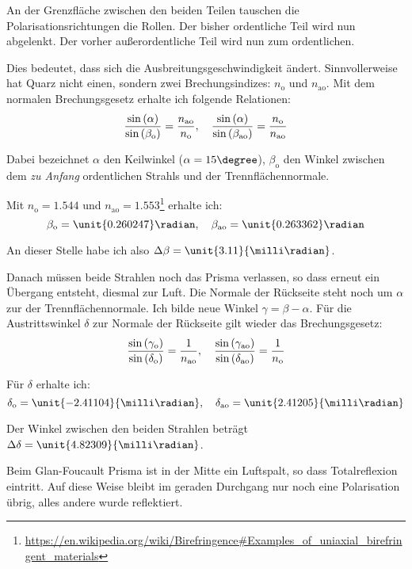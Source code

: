 An der Grenzfläche zwischen den beiden Teilen tauschen die
Polarisationsrichtungen die Rollen. Der bisher ordentliche Teil wird nun
abgelenkt. Der vorher außerordentliche Teil wird nun zum ordentlichen.

Dies bedeutet, dass sich die Ausbreitungsgeschwindigkeit ändert. Sinnvollerweise hat Quarz nicht einen, sondern zwei Brechungsindizes: $n_\text{o}$ und $n_\text{ao}$. Mit dem normalen Brechungsgesetz erhalte ich folgende Relationen:
\[
	\frac{\sin\del{\alpha}}{\sin\del{\beta_\text{o}}}
	= \frac{n_\text{ao}}{n_\text{o}}
	\eqnsep
	\frac{\sin\del{\alpha}}{\sin\del{\beta_\text{ao}}}
	= \frac{n_\text{o}}{n_\text{ao}}
\]

Dabei bezeichnet $\alpha$ den Keilwinkel ($\alpha = 15\degree$),
$\beta_\text{o}$ den Winkel zwischen dem \emph{zu Anfang} ordentlichen Strahls
und der Trennflächennormale.

Mit $n_\text{o} = 1.544$ und $n_\text{ao} = 1.553$\footnote{\url{https://en.wikipedia.org/wiki/Birefringence\#Examples\_of\_uniaxial\_birefringent\_materials}} erhalte ich:
\[
	\beta_\text{o} = \unit{0.260247}\radian
	\eqnsep
	\beta_\text{ao} = \unit{0.263362}\radian
\]

An dieser Stelle habe ich also $\Delta \beta = \unit{3.11}{\milli\radian}$.

Danach müssen beide Strahlen noch das Prisma verlassen, so dass erneut ein
Übergang entsteht, diesmal zur Luft. Die Normale der Rückseite steht noch um
$\alpha$ zur der Trennflächennormale. Ich bilde neue Winkel $\gamma = \beta -
\alpha$.  Für die Austrittswinkel $\delta$ zur Normale der Rückseite gilt
wieder das Brechungsgesetz:
\[
	\frac{\sin\del{\gamma_\text{o}}}{\sin\del{\delta_\text{o}}}
	= \frac{1}{n_\text{ao}}
	\eqnsep
	\frac{\sin\del{\gamma_\text{ao}}}{\sin\del{\delta_\text{ao}}}
	= \frac{1}{n_\text{o}}
\]

Für $\delta$ erhalte ich:
\[
	\delta_\text{o} = \unit{-2.41104}{\milli\radian}
	\eqnsep
	\delta_\text{ao} = \unit{2.41205}{\milli\radian}
\]

Der Winkel zwischen den beiden Strahlen beträgt $\Delta \delta =
\unit{4.82309}{\milli\radian}$.

Beim Glan-Foucault Prisma ist in der Mitte ein Luftspalt, so dass
Totalreflexion eintritt. Auf diese Weise bleibt im geraden Durchgang nur noch
eine Polarisation übrig, alles andere wurde reflektiert.



